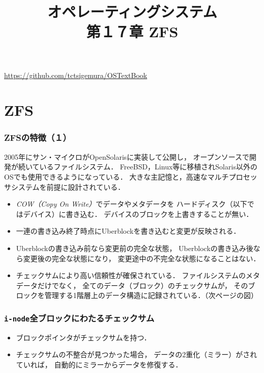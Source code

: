 \documentclass[unicode]{beamer}                   %
\newcommand{\inode}{\texttt{i-node}}
\begin{document}
\title[ZFS]
      {オペレーティングシステム\\第１７章 ZFS}
\date{}
\begin{frame}
  \titlepage
  \centerline{\url{https://github.com/tctsigemura/OSTextBook}}
\end{frame}


\section{ZFS}
\begin{frame}
  \frametitle{ZFSの特徴（１）}
  2005年にサン・マイクロがOpenSolarisに実装して公開し，
  オープンソースで開発が続いているファイルシステム．
  FreeBSD，Linux等に移植されSolaris以外のOSでも使用できるようになっている．
  大きな主記憶と，高速なマルチプロセッサシステムを前提に設計されている．

  \begin{itemize}
  \item \emph{COW（Copy On Write）}でデータやメタデータを
    ハードディスク（以下ではデバイス）に書き込む．
    デバイスのブロックを上書きすることが無い．
  \item 一連の書き込み終了時点にUberblockを書き込むと変更が反映される．
  \item Uberblockの書き込み前なら変更前の完全な状態，
    Uberblockの書き込み後なら変更後の完全な状態になり，
    変更途中の不完全な状態になることはない．
  \item チェックサムにより高い信頼性が確保されている．
    ファイルシステムのメタデータだけでなく，
    全てのデータ（ブロック）のチェックサムが，
    そのブロックを管理する1階層上のデータ構造に記録されている．（次ページの図）
  \end{itemize}
  \vfill
\end{frame}

\begin{frame}
  \frametitle{\inode 全ブロックにわたるチェックサム}
  \begin{itemize}
    \item ブロックポインタがチェックサムを持つ．
    \item チェックサムの不整合が見つかった場合，
      データの2重化（ミラー）がされていれば，
      自動的にミラーからデータを修復する．
  \end{itemize}
  \vfill
\end{frame}
\end{document}
